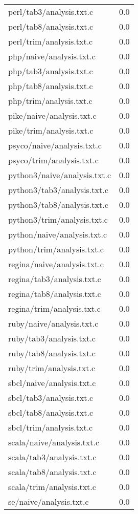 \begin{longtable}{l r}
{perl/tab3/analysis.txt.c} & 0.0  \\
{perl/tab8/analysis.txt.c} & 0.0  \\
{perl/trim/analysis.txt.c} & 0.0  \\
{php/naive/analysis.txt.c} & 0.0  \\
{php/tab3/analysis.txt.c} & 0.0  \\
{php/tab8/analysis.txt.c} & 0.0  \\
{php/trim/analysis.txt.c} & 0.0  \\
{pike/naive/analysis.txt.c} & 0.0  \\
{pike/trim/analysis.txt.c} & 0.0  \\
{psyco/naive/analysis.txt.c} & 0.0  \\
{psyco/trim/analysis.txt.c} & 0.0  \\
{python3/naive/analysis.txt.c} & 0.0  \\
{python3/tab3/analysis.txt.c} & 0.0  \\
{python3/tab8/analysis.txt.c} & 0.0  \\
{python3/trim/analysis.txt.c} & 0.0  \\
{python/naive/analysis.txt.c} & 0.0  \\
{python/trim/analysis.txt.c} & 0.0  \\
{regina/naive/analysis.txt.c} & 0.0  \\
{regina/tab3/analysis.txt.c} & 0.0  \\
{regina/tab8/analysis.txt.c} & 0.0  \\
{regina/trim/analysis.txt.c} & 0.0  \\
{ruby/naive/analysis.txt.c} & 0.0  \\
{ruby/tab3/analysis.txt.c} & 0.0  \\
{ruby/tab8/analysis.txt.c} & 0.0  \\
{ruby/trim/analysis.txt.c} & 0.0  \\
{sbcl/naive/analysis.txt.c} & 0.0  \\
{sbcl/tab3/analysis.txt.c} & 0.0  \\
{sbcl/tab8/analysis.txt.c} & 0.0  \\
{sbcl/trim/analysis.txt.c} & 0.0  \\
{scala/naive/analysis.txt.c} & 0.0  \\
{scala/tab3/analysis.txt.c} & 0.0  \\
{scala/tab8/analysis.txt.c} & 0.0  \\
{scala/trim/analysis.txt.c} & 0.0  \\
{se/naive/analysis.txt.c} & 0.0  \\

\end{longtable}
